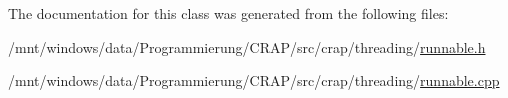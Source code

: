 The documentation for this class was generated from the following files\-:\begin{DoxyCompactItemize}
\item 
/mnt/windows/data/\-Programmierung/\-C\-R\-A\-P/src/crap/threading/\hyperlink{runnable_8h}{runnable.\-h}\item 
/mnt/windows/data/\-Programmierung/\-C\-R\-A\-P/src/crap/threading/\hyperlink{runnable_8cpp}{runnable.\-cpp}\end{DoxyCompactItemize}
